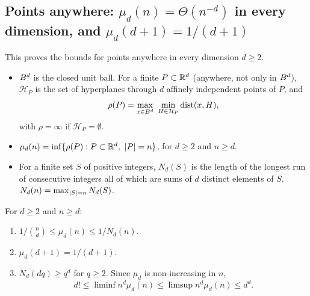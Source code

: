 \subsection{Points anywhere: \texorpdfstring{$\mu_d(n)=\Theta(n^{-d})$}{mu\_d(n) = Theta(n\textasciicircum -d)} in every dimension, and \texorpdfstring{$\mu_d(d+1)=1/(d+1)$}{mu\_d(d+1) = 1/(d+1)}}
\label{sec:D-anywhere}

This proves the bounds for points anywhere in every dimension $d\ge2$.

\begin{definition}\leavevmode
\begin{itemize}
  \item $B^d$ is the closed unit ball. For a finite $P\subset\mathbb{R}^d$ (anywhere, not only in
    $B^d$), $\mathcal{H}_P$ is the set of hyperplanes through $d$ affinely independent points
    of $P$, and
    \[
      \rho(P)=\max_{x\in\ball^d}\ \min_{H\in\mathcal{H}_P}\dist(x,H),
    \]
    with $\rho=\infty$ if $\mathcal{H}_P=\emptyset$.
  \item $\mu_d(n)=\inf\{\rho(P):P\subset\R^d,\ \abs{P}=n\}$, for $d\ge2$ and $n\ge d$.
  \item For a finite set $S$ of positive integers, $N_d(S)$ is the length of the longest run of
    consecutive integers all of which are sums of $d$ distinct elements of $S$.
    $N_d(n)=\max_{\left|S\right|=n}N_d(S)$.
\end{itemize}
\end{definition}

\begin{proposition}\label{D:anywhere}
For $d\ge2$ and $n\ge d$:
\begin{enumerate}[label=(\roman*)]
  \item $1/\binom{n}{d}\le\mu_d(n)\le1/N_d(n)$.
  \item $\mu_d(d+1)=1/(d+1)$.
  \item $N_d(dq)\ge q^d$ for $q\ge2$. Since $\mu_d$ is non-increasing in $n$,
    \[
      d!\le\liminf n^d\mu_d(n)\le\limsup n^d\mu_d(n)\le d^d.
    \]
\end{enumerate}
\end{proposition}

